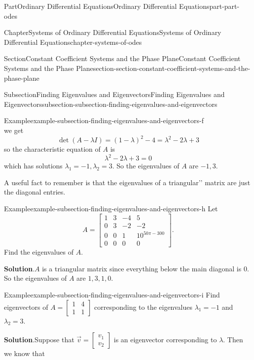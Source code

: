 \documentclass[twoside,10pt,]{book}
\newcommand{\blocktitlefont}{\relax}
\numberwithin{equation}{part}
\begin{document}
\begin{partptx}{Part}{Ordinary Differential Equations}{}{Ordinary Differential Equations}{}{}{part-part-odes}
\begin{chapterptx}{Chapter}{Systems of Ordinary Differential Equations}{}{Systems of Ordinary Differential Equations}{}{}{chapter-systems-of-odes}
\begin{sectionptx}{Section}{Constant Coefficient Systems and the Phase Plane}{}{Constant Coefficient Systems and the Phase Plane}{}{}{section-section-constant-coefficient-systems-and-the-phase-plane}
\begin{subsectionptx}{Subsection}{Finding Eigenvalues and Eigenvectors}{}{Finding Eigenvalues and Eigenvectors}{}{}{subsection-subsection-finding-eigenvalues-and-eigenvectors}
\begin{example}{Example}{}{example-subsection-finding-eigenvalues-and-eigenvectors-f}
\begin{equation*}
\end{equation*}
we get%
\begin{equation*}
\det(A-\lambda I) = (1-\lambda)^{2} - 4 = \lambda^{2}-2\lambda+3
\end{equation*}
so the characteristic equation of \(A\) is%
\begin{equation*}
\lambda^{2}-2\lambda+3 = 0
\end{equation*}
which has solutions \(\lambda_{1} = -1,\lambda_{2} = 3\). So the eigenvalues of \(A\) are \(-1,3\).%
\end{example}
A useful fact to remember is that the eigenvalues of a \textasciigrave{}\textasciigrave{}triangular'{}'{} matrix are just the diagonal entries.%
\begin{example}{Example}{}{example-subsection-finding-eigenvalues-and-eigenvectors-h}%
Let%
\begin{equation*}
A = \begin{bmatrix}1 &  3 &  -4 &  5 \\ 0 &  3 &  -2 &  -2 \\ 0 &  0 &  1 &  10^{50\pi-300} \\ 0 &  0 &  0 &  0\end{bmatrix}.
\end{equation*}
Find the eigenvalues of \(A\).%
\par\smallskip%
\noindent\textbf{\blocktitlefont Solution}.\hypertarget{solution-subsection-finding-eigenvalues-and-eigenvectors-h-b}{}\quad{}\(A\) is a triangular matrix since everything below the main diagonal is \(0\). So the eigenvalues of \(A\) are \(1,3,1,0\).%
\end{example}
\begin{example}{Example}{}{example-subsection-finding-eigenvalues-and-eigenvectors-i}%
Find eigenvectors of \(A = \begin{bmatrix}1 &  4 \\ 1 &  1\end{bmatrix}\) corresponding to the eigenvalues \(\lambda_{1} = -1\) and \(\lambda_{2} = 3\).%
\par\smallskip%
\noindent\textbf{\blocktitlefont Solution}.\hypertarget{solution-subsection-finding-eigenvalues-and-eigenvectors-i-b}{}\quad{}Suppose that \(\vec{v} = \begin{bmatrix} v_{1} \\ v_{2} \end{bmatrix}\) is an eigenvector corresponding to \(\lambda\). Then we know that%

\end{example}
\end{subsectionptx}
\end{sectionptx}
\end{chapterptx}
\end{partptx}
\end{document}
